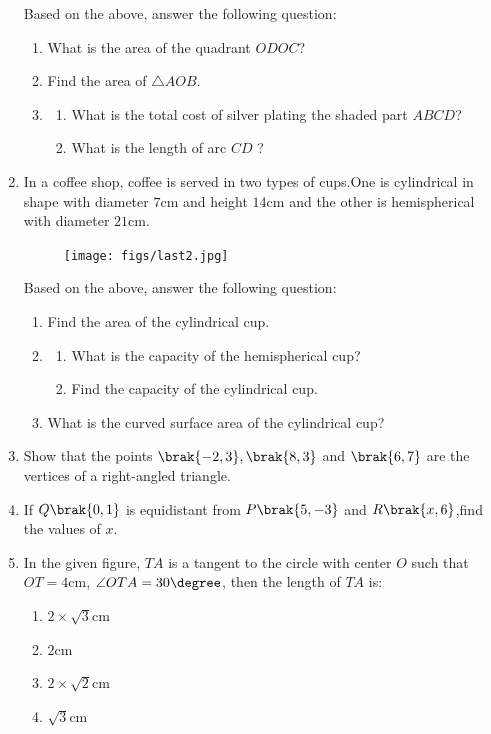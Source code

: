 \begin{enumerate}
	\text Based on the above, answer the following question:
		\begin{enumerate}
			\item What is the area of the quadrant $ODOC$?
			\item Find the area of $\triangle AOB$.
			\item
			\begin{enumerate}
				\item What is the total cost of silver plating the shaded part $ABCD$?
				\item What is the length of arc $CD$ ?
			\end{enumerate}
		\end{enumerate}
\newpage
\item In a coffee shop, coffee is served in two types of cups.One is cylindrical  in shape with diameter $7 \mathrm{cm}$ and height $14 \mathrm{cm} $ and the other is hemispherical with diameter $21 \mathrm{cm}$.

	
	\begin{figure}[!ht]
		\centering
		\texttt{[image: figs/last2.jpg]}
		\caption{}
		\label{fig:enter-label}
	\end{figure}

	\text Based on the above, answer the following question:
	\begin{enumerate}
		\item  Find the area of the cylindrical cup.
		\item
		\begin{enumerate}
			\item  What is the capacity of the hemispherical cup?
			\item Find the capacity of the cylindrical cup.
		\end{enumerate}
		\item   What is the curved surface area of the cylindrical cup?
         \end{enumerate}

\newpage	
\item Show that the points $\brak{-2,3}, \brak{8,3}$ and $\brak{6,7} $ are the vertices of a right-angled triangle.

\item If $Q\brak{0,1}$ is equidistant from $P\brak{5,-3}$ and $R\brak{x,6}$,find the values of $x$.
\item In the given figure, $TA$ is a tangent to the circle with center $O$ such that $OT = 4\mathrm{cm}$, $\angle OTA = 30\degree$, then the length of $TA$ is:
    \begin{enumerate}
        \item $2 \times \sqrt{3} \mathrm{cm}$
        \item $2\mathrm{cm}$
        \item $2 \times \sqrt{2}\mathrm{cm}$
        \item $\sqrt{3}\mathrm{cm}$
    \end{enumerate}
    

\end{enumerate}
